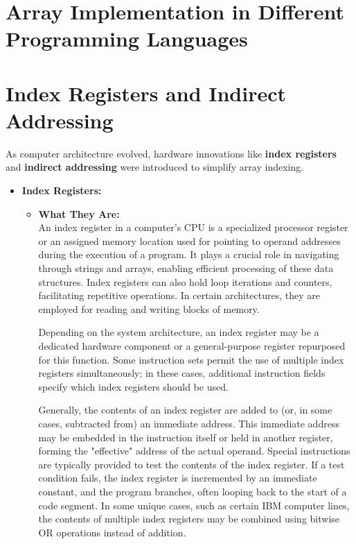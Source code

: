 \documentclass[12pt, oneside]{book}
\begin{document}
\section{Array Implementation in Different Programming Languages}
\section{Index Registers and Indirect Addressing}

As computer architecture evolved, hardware innovations like \textbf{index registers} and  \textbf{indirect addressing} were introduced to simplify array indexing.
\begin{itemize}
	\item \textbf{Index Registers:}
	\begin{itemize}
		\item \textbf{What They Are:} \\
		An index register in a computer's CPU is a specialized processor register or an assigned memory location used for pointing to operand addresses during the execution of a program. It plays a crucial role in navigating through strings and arrays, enabling efficient processing of these data structures. Index registers can also hold loop iterations and counters, facilitating repetitive operations. In certain architectures, they are employed for reading and writing blocks of memory.
		
		Depending on the system architecture, an index register may be a dedicated hardware component or a general-purpose register repurposed for this function. Some instruction sets permit the use of multiple index registers simultaneously; in these cases, additional instruction fields specify which index registers should be used.
		
		Generally, the contents of an index register are added to (or, in some cases, subtracted from) an immediate address. This immediate address may be embedded in the instruction itself or held in another register, forming the "effective" address of the actual operand. Special instructions are typically provided to test the contents of the index register. If a test condition fails, the index register is incremented by an immediate constant, and the program branches, often looping back to the start of a code segment. In some unique cases, such as certain IBM computer lines, the contents of multiple index registers may be combined using bitwise OR operations instead of addition.
		

\end{itemize}
\end{itemize}
\end{document}
